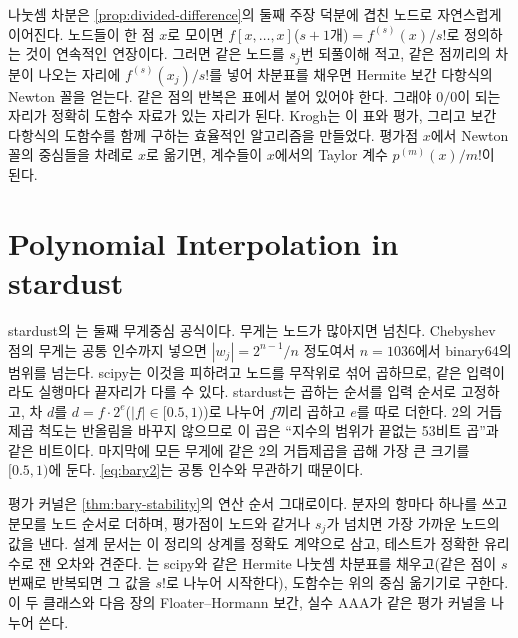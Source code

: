 나눗셈 차분은 \cref{prop:divided-difference}의 둘째 주장 덕분에 겹친 노드로 자연스럽게 이어진다. 노드들이 한 점 $x$로 모이면 $f[x,\dots,x]$($s+1$개)$=f^{(s)}(x)/s!$로 정의하는 것이 연속적인 연장이다. 그러면 같은 노드를 $s_j$번 되풀이해 적고, 같은 점끼리의 차분이 나오는 자리에 $f^{(s)}(x_j)/s!$를 넣어 차분표를 채우면 Hermite 보간 다항식의 Newton 꼴을 얻는다. 같은 점의 반복은 표에서 붙어 있어야 한다. 그래야 $0/0$이 되는 자리가 정확히 도함수 자료가 있는 자리가 된다. Krogh는 이 표와 평가, 그리고 보간 다항식의 도함수를 함께 구하는 효율적인 알고리즘을 만들었다\cite{krogh1970}. 평가점 $x$에서 Newton 꼴의 중심들을 차례로 $x$로 옮기면, 계수들이 $x$에서의 Taylor 계수 $p^{(m)}(x)/m!$이 된다.

\section{Polynomial Interpolation in stardust}
\label{sec:interp-stardust}

\begin{instardust}
stardust의 는 둘째 무게중심 공식이다. 무게는 노드가 많아지면 넘친다. Chebyshev 점의 무게는 공통 인수까지 넣으면 $|w_j|=2^{n-1}/n$ 정도여서 $n=1036$에서 binary64의 범위를 넘는다. scipy는 이것을 피하려고 노드를 무작위로 섞어 곱하므로, 같은 입력이라도 실행마다 끝자리가 다를 수 있다. stardust는 곱하는 순서를 입력 순서로 고정하고, 차 $d$를 $d=f\cdot2^e$($|f|\in[0.5,1)$)로 나누어 $f$끼리 곱하고 $e$를 따로 더한다. 2의 거듭제곱 척도는 반올림을 바꾸지 않으므로 이 곱은 ``지수의 범위가 끝없는 53비트 곱''과 같은 비트이다. 마지막에 모든 무게에 같은 2의 거듭제곱을 곱해 가장 큰 크기를 $[0.5,1)$에 둔다. \eqref{eq:bary2}는 공통 인수와 무관하기 때문이다.
\end{instardust}

\begin{instardust}
평가 커널은 \cref{thm:bary-stability}의 연산 순서 그대로이다. 분자의 항마다  하나를 쓰고 분모를 노드 순서로 더하며, 평가점이 노드와 같거나 $s_j$가 넘치면 가장 가까운 노드의 값을 낸다. 설계 문서는 이 정리의 상계를 정확도 계약으로 삼고, 테스트가 정확한 유리수로 잰 오차와 견준다. 는 scipy와 같은 Hermite 나눗셈 차분표를 채우고(같은 점이 $s$번째로 반복되면 그 값을 $s!$로 나누어 시작한다), 도함수는 위의 중심 옮기기로 구한다. 이 두 클래스와 다음 장의 Floater--Hormann 보간, 실수 AAA가 같은 평가 커널을 나누어 쓴다.
\end{instardust}

